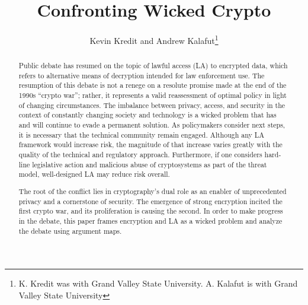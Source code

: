 \documentclass{IEEEtran}
\begin{document}

\title{Confronting Wicked Crypto}

\author{Kevin Kredit and Andrew Kalafut\thanks{K. Kredit was with Grand Valley State University. A. Kalafut is with Grand Valley State University}}


\maketitle



\begin{abstract}



Public debate has resumed on the topic of lawful access (LA) to encrypted data, which refers to alternative means of
decryption intended for law enforcement use. The resumption of this debate is not a renege on a resolute promise made at
the end of the 1990s ``crypto war''; rather, it represents a valid reassessment of optimal policy in light of changing
circumstances. The imbalance between privacy, access, and security in the context of constantly changing society and
technology is a wicked problem that has and will continue to evade a permanent solution. As policymakers consider next
steps, it is necessary that the technical community remain engaged. Although any LA framework would increase risk, the
magnitude of that increase varies greatly with the quality of the technical and regulatory approach. Furthermore, if one
considers hard-line legislative action and malicious abuse of cryptosystems as part of the threat model, well-designed
LA may reduce risk overall.

The root of the conflict lies in cryptography's dual role as an enabler of unprecedented privacy and a
cornerstone of security. The emergence of strong encryption incited the first crypto war, and its proliferation is
causing the second. In order to make progress in the debate, this paper frames encryption and LA as a wicked problem and
analyze the debate using argument maps.

\end{abstract}
\end{document}
